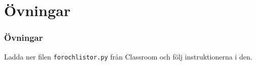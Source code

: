 \documentclass[aspectratio=169]{beamer}
\begin{document}
\section{Övningar}

\begin{frame}
	\frametitle{Övningar}
	
	Ladda ner filen \texttt{forochlistor.py} från Classroom och följ instruktionerna i den.
	
\end{frame}


%
%
% 
% 
%
\end{document}
